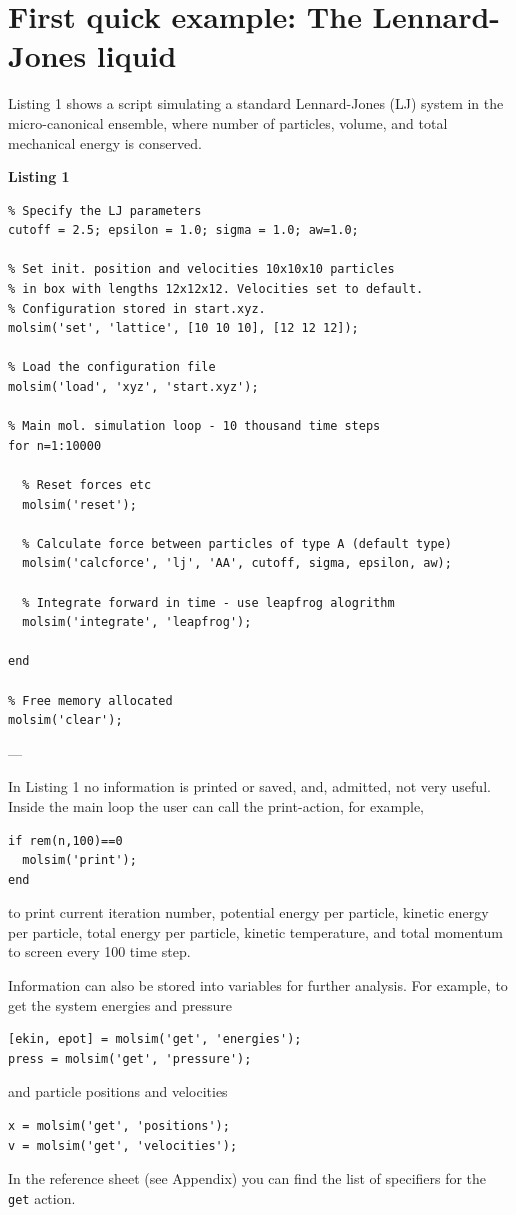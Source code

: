 \documentclass[11pt]{article}
\begin{document}
\section{First quick example: The Lennard-Jones liquid}
Listing 1 shows a script simulating a standard Lennard-Jones (LJ) system in the
micro-canonical ensemble, where number of particles, volume, and total
mechanical energy is conserved.

\bigskip

\noindent \textbf{Listing 1}
\begin{verbatim}
% Specify the LJ parameters
cutoff = 2.5; epsilon = 1.0; sigma = 1.0; aw=1.0;

% Set init. position and velocities 10x10x10 particles 
% in box with lengths 12x12x12. Velocities set to default. 
% Configuration stored in start.xyz. 
molsim('set', 'lattice', [10 10 10], [12 12 12]);

% Load the configuration file
molsim('load', 'xyz', 'start.xyz');

% Main mol. simulation loop - 10 thousand time steps
for n=1:10000

  % Reset forces etc
  molsim('reset');

  % Calculate force between particles of type A (default type)
  molsim('calcforce', 'lj', 'AA', cutoff, sigma, epsilon, aw);

  % Integrate forward in time - use leapfrog alogrithm
  molsim('integrate', 'leapfrog');
 
end

% Free memory allocated
molsim('clear');
\end{verbatim}
---

\noindent In Listing 1 no information is printed or saved, and, admitted, not very
useful. Inside the main loop the user can call the \textsf{print}-action, for
example, 
\begin{verbatim}
if rem(n,100)==0
  molsim('print');
end
\end{verbatim}
to print current iteration number, potential energy per particle, kinetic energy
per particle, total energy per particle, kinetic temperature, and total momentum
to screen every 100 time step.

Information can also be stored into variables for further analysis. For example,
to get the system energies and pressure
\begin{verbatim}
[ekin, epot] = molsim('get', 'energies');
press = molsim('get', 'pressure');
\end{verbatim}
and particle positions and velocities
\begin{verbatim}
x = molsim('get', 'positions');
v = molsim('get', 'velocities');
\end{verbatim}
In the reference sheet (see Appendix) you can find the list of
specifiers for the \verb!get! action.
\end{document}
